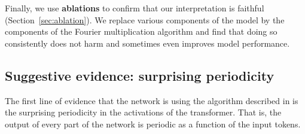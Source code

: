 \documentclass{article} %
\newcommand{\cosp}[1]{\cos \left ( #1 \right )}
\newcommand{\sinp}[1]{\sin \left ( #1 \right )}
\begin{document}
Finally, we use \textbf{ablations} to confirm that our interpretation is faithful (Section~\ref{sec:ablation}). We replace various components of the model by the components of the Fourier multiplication algorithm and find that doing so consistently does not harm and sometimes even improves model performance.


\subsection{Suggestive evidence: surprising periodicity}
\label{sec:activation-analysis}
\label{sec:periodicity}
The first line of evidence that the network is using the algorithm described in  is the surprising periodicity in the activations of the transformer. That is, the output of every part of the network is periodic as a function of the input tokens.  
\end{document}
